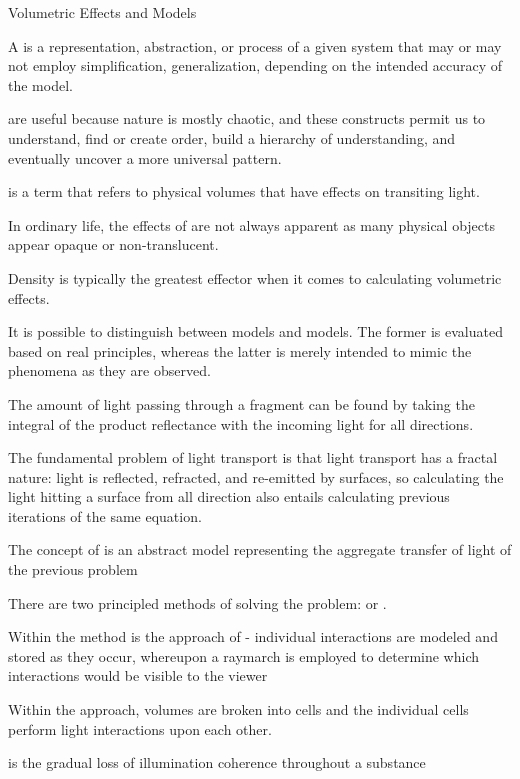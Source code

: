 \documentclass[11pt]{article}
\begin{document}
\maketitle

\begin{topic}{Volumetric Effects and Models}
	\item A  is a representation, abstraction, or process of a given system that may or may not employ simplification, generalization, depending on the intended accuracy of the model.
	\item {} are useful because nature is mostly chaotic, and these constructs permit us to understand, find or create order, build a hierarchy of understanding, and eventually uncover a more universal pattern.
	\item {} is a term that refers to physical volumes that have effects on transiting light.
	\item In ordinary life, the effects of  are not always apparent as many physical objects appear opaque or non-translucent.
	\item Density is typically the greatest effector when it comes to calculating volumetric effects.
	\item It is possible to distinguish between  models and  models. The former is evaluated based on real principles, whereas the latter is merely intended to mimic the phenomena as they are observed.
	\item The amount of light passing through a fragment can be found by taking the integral of the product reflectance with the incoming light for all directions.
	\item The fundamental problem of light transport is that light transport has a fractal nature: light is reflected, refracted, and re-emitted by surfaces, so calculating the light hitting a surface from all direction also entails calculating previous iterations of the same equation.
	\item The concept of  is an abstract model representing the aggregate transfer of light of the previous problem
	\item There are two principled methods of solving the  problem:  or .
	\item Within the  method is the approach of  - individual  interactions are modeled and stored as they occur, whereupon a raymarch is employed to determine which interactions would be visible to the viewer
	\item Within the  approach, volumes are broken into cells and the individual cells perform light interactions upon each other.
	\item {} is the gradual loss of illumination coherence throughout a substance
\end{topic}
\end{document}

